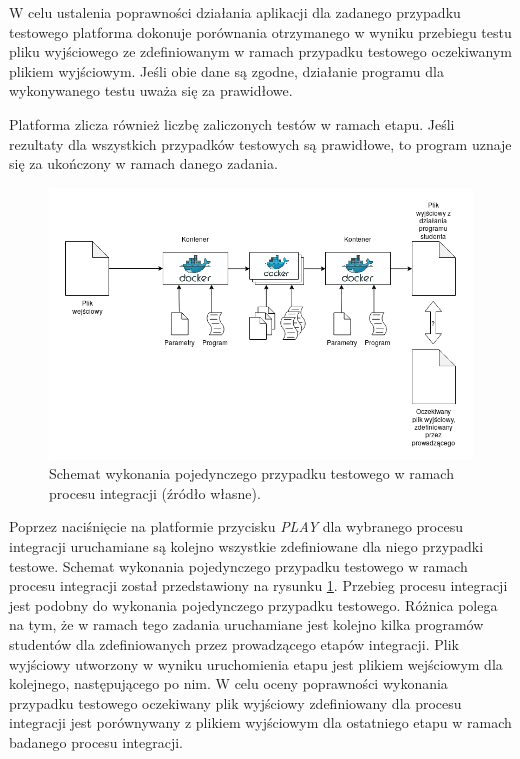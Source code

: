 W celu ustalenia poprawności działania aplikacji dla zadanego przypadku testowego platforma dokonuje porównania otrzymanego w wyniku przebiegu testu pliku wyjściowego ze zdefiniowanym w ramach przypadku testowego oczekiwanym plikiem wyjściowym.
Jeśli obie dane są zgodne, działanie programu dla wykonywanego testu uważa się za prawidłowe.

Platforma zlicza również liczbę zaliczonych testów w ramach etapu.
Jeśli rezultaty dla wszystkich przypadków testowych są prawidłowe, to program uznaje się za ukończony w ramach danego zadania.

\begin{figure}[h]
    \centering
    \includegraphics[width = 12cm]{chapter05/integration.png}
    \caption{Schemat wykonania pojedynczego przypadku testowego w ramach procesu integracji (źródło własne).}
    \label{fig:integration}
\end{figure}

Poprzez naciśnięcie na platformie przycisku \textit{PLAY} dla wybranego procesu integracji uruchamiane są kolejno wszystkie zdefiniowane dla niego przypadki testowe.
Schemat wykonania pojedynczego przypadku testowego w ramach procesu integracji został przedstawiony na rysunku \ref{fig:integration}.
Przebieg procesu integracji jest podobny do wykonania pojedynczego przypadku testowego.
Różnica polega na tym, że w ramach tego zadania uruchamiane jest kolejno kilka programów studentów dla zdefiniowanych przez prowadzącego etapów integracji.
Plik wyjściowy utworzony w wyniku uruchomienia etapu jest plikiem wejściowym dla kolejnego, następującego po nim.
W celu oceny poprawności wykonania przypadku testowego oczekiwany plik wyjściowy zdefiniowany dla procesu integracji jest porównywany z plikiem wyjściowym dla ostatniego etapu w ramach badanego procesu integracji.

